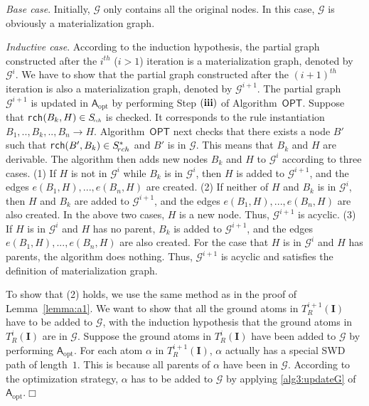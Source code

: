 \emph{Base case}. Initially, $\mathcal{G}$ only contains all the original nodes.
In this case, $\mathcal{G}$ is obviously a materialization graph.

\emph{Inductive case}.
According to the induction hypothesis, the partial graph constructed after
the $i^{th}$ ($i>1$) iteration is a materialization graph, denoted by $\mathcal{G}^{i}$.
We have to show that the partial graph constructed after the $(i+1)^{th}$ iteration is
also a materialization graph, denoted by $\mathcal{G}^{i+1}$.
The partial graph $\mathcal{G}^{i+1}$ is updated in $\mathsf{A}_{\text{opt}}$ by performing Step $(\textbf{\romannumeral3})$
of Algorithm~$\mathsf{OPT}$.
Suppose that \texttt{rch}$(B_k,H)\in S_{\textit{\!\tiny rch}}$ is checked.
It corresponds to the rule instantiation $B_1,..,B_k,..,B_n\rightarrow H$.
Algorithm~$\mathsf{OPT}$ next checks that there exists a node $B'$ such that
\texttt{rch}$(B',B_k)\in S^*_{\!\tiny rch}$
and $B'$ is in $\mathcal{G}$. This means that $B_k$ and $H$ are derivable.
The algorithm then adds new nodes $B_k$ and $H$ to $\mathcal{G}^{i}$
according to three cases.
(1) If $H$ is not in $\mathcal{G}^{i}$ while $B_k$ is in $\mathcal{G}^{i}$,
then $H$ is added to $\mathcal{G}^{i+1}$, and the edges $e(B_1, H),...,e(B_n, H)$ are created.
(2) If neither of $H$ and $B_k$ is in $\mathcal{G}^{i}$,
then $H$ and $B_k$ are added to $\mathcal{G}^{i+1}$, and the edges $e(B_1, H),...,e(B_n, H)$ are also created.
In the above two cases, $H$ is a new node. Thus,
$\mathcal{G}^{i+1}$ is acyclic.
(3) If $H$ is in $\mathcal{G}^{i}$ and $H$ has no parent,
$B_k$ is added to $\mathcal{G}^{i+1}$, and the edges $e(B_1, H),...,e(B_n, H)$ are also created.
For the case that $H$ is in $\mathcal{G}^{i}$ and $H$ has parents,
the algorithm does nothing.
Thus, $\mathcal{G}^{i+1}$ is acyclic and satisfies the definition of materialization graph.

To show that (2) holds, we use the same method as in the proof of Lemma~\ref{lemma:a1}.
We want to show that all the ground atoms in $T_R^{i+1}(\textbf{I})$ have to be added to $\mathcal{G}$,
with the induction hypothesis that the ground atoms in $T_R^{i}(\textbf{I})$ are in $\mathcal{G}$.
Suppose the ground atoms in $T_R^{i}(\textbf{I})$ have been added to $\mathcal{G}$ by
performing $\mathsf{A}_{\text{opt}}$.
For each atom $\alpha$ in $T_R^{i+1}(\textbf{I})$, $\alpha$ actually has a special SWD path
of length~$1$. This is because all parents of $\alpha$ have been in $\mathcal{G}$.
According to the optimization strategy, $\alpha$ has to be added to $\mathcal{G}$ by applying \ref{alg3:updateG}
of $\mathsf{A}_{\text{opt}}$.\hfill$\Box$


